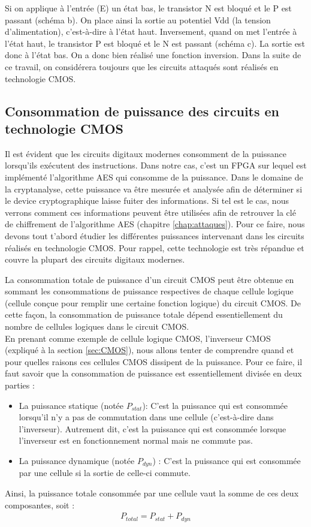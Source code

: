 \documentclass[oneside]{book}
\begin{document}
Si on applique à l'entrée (E) un état bas, le transistor N est bloqué et le P est passant (schéma b). On place ainsi la sortie au potentiel Vdd (la tension d'alimentation), c'est-à-dire à l'état haut. Inversement, quand on met l'entrée à l'état haut, le transistor P est bloqué et le N est passant (schéma c). La sortie est donc à l'état bas. On a donc bien réalisé une fonction inversion. Dans la suite de ce travail, on considérera toujours que les circuits attaqués sont réalisés en technologie CMOS.


\subsection{Consommation de puissance des circuits en technologie CMOS}
\label{sec:puissance}

Il est évident que les circuits digitaux modernes consomment de la puissance lorsqu'ils exécutent des instructions. Dans notre cas, c'est un FPGA sur lequel est implémenté l'algorithme AES qui consomme de la puissance. Dans le domaine de la cryptanalyse, cette puissance va être mesurée et analysée afin de déterminer si le device cryptographique laisse fuiter des informations. Si tel est le cas, nous verrons comment ces informations peuvent être utilisées afin de retrouver la clé de chiffrement de l'algorithme AES (chapitre \ref{chap:attaques}). Pour ce faire, nous devons tout t'abord étudier les différentes puissances intervenant dans les circuits réalisés en technologie CMOS. Pour rappel, cette technologie est très répandue et couvre la plupart des circuits digitaux modernes. 

La consommation totale de puissance d'un circuit CMOS peut être obtenue en sommant les consommations de puissance respectives de chaque cellule logique (cellule conçue pour remplir une certaine fonction logique) du circuit CMOS. De cette façon, la consommation de puissance totale dépend essentiellement du nombre de cellules logiques dans le circuit CMOS. \\
En prenant comme exemple de cellule logique CMOS, l'inverseur CMOS (expliqué à la section \ref{sec:CMOS}), nous allons tenter de comprendre quand et pour quelles raisons ces cellules CMOS dissipent de la puissance. Pour ce faire, il faut savoir que la consommation de puissance est essentiellement divisée en deux parties : 
\begin{itemize}
\item La puissance statique (notée $P_{stat}$): C'est la puissance qui est consommée lorsqu'il n'y a pas de commutation dans une cellule (c'est-à-dire dans l'inverseur). Autrement dit, c'est la puissance qui est consommée lorsque l'inverseur est en fonctionnement normal mais ne commute pas.
\item La puissance dynamique (notée $P_{dyn}$) : C'est la puissance qui est consommée par une cellule si la sortie de celle-ci commute. 
\end{itemize}
Ainsi, la puissance totale consommée par une cellule vaut la somme de ces deux composantes, soit :
\begin{gather}
	P_{total} = P_{stat} + P_{dyn}
\end{gather}
\end{document}
